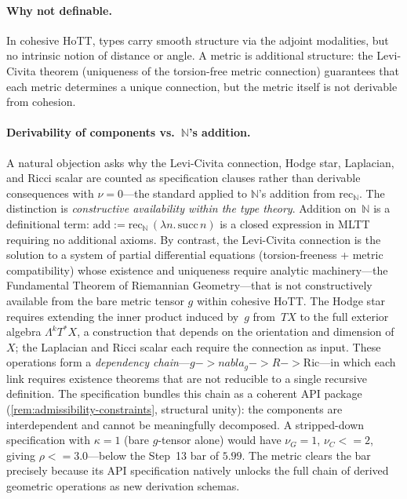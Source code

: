 \documentclass[11pt,a4paper]{article}
\def\leq{<=}%
\def\to{->}%
\def\nabla{nabla}%
\theoremstyle{plain}
\theoremstyle{definition}
\theoremstyle{remark}
\newcommand{\N}{\mathbb{N}}
\begin{document}
\paragraph{Why not definable.}
In cohesive HoTT, types carry smooth structure via the adjoint modalities, but no intrinsic notion of distance or angle.
A metric is additional structure: the Levi-Civita theorem (uniqueness of the torsion-free metric connection) guarantees that each metric determines a unique connection, but the metric itself is not derivable from cohesion.

\paragraph{Derivability of components vs.\ $\N$'s addition.}
A natural objection asks why the Levi-Civita connection, Hodge star, Laplacian, and Ricci scalar are counted as specification clauses rather than derivable consequences with $\nu = 0$---the standard applied to $\N$'s addition from $\mathrm{rec}_\N$.
The distinction is \emph{constructive availability within the type theory}.
Addition on~$\N$ is a definitional term: $\mathrm{add} := \mathrm{rec}_\N\,(\lambda n.\,\mathrm{succ}\,n)$ is a closed expression in MLTT requiring no additional axioms.
By contrast, the Levi-Civita connection is the solution to a system of partial differential equations (torsion-freeness + metric compatibility) whose existence and uniqueness require analytic machinery---the Fundamental Theorem of Riemannian Geometry---that is not constructively available from the bare metric tensor $g$ within cohesive HoTT.
The Hodge star requires extending the inner product induced by~$g$ from~$TX$ to the full exterior algebra $\Lambda^k T^*X$, a construction that depends on the orientation and dimension of~$X$; the Laplacian and Ricci scalar each require the connection as input.
These operations form a \emph{dependency chain}---$g \to \nabla_g \to R \to \mathrm{Ric}$---in which each link requires existence theorems that are not reducible to a single recursive definition.
The specification bundles this chain as a coherent API package (\cref{rem:admissibility-constraints}, structural unity): the components are interdependent and cannot be meaningfully decomposed.
A stripped-down specification with $\kappa = 1$ (bare $g$-tensor alone) would have $\nu_G = 1$, $\nu_C \leq 2$, giving $\rho \leq 3.0$---below the Step~13 bar of $5.99$.
The metric clears the bar precisely because its API specification natively unlocks the full chain of derived geometric operations as new derivation schemas.
\end{document}
